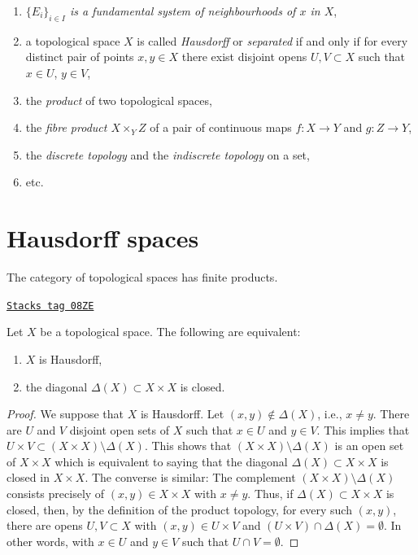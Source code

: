 \begin{enumerate}
$\mathcal{U} : U = \bigcup_{i \in I} U_i$
this means each $V_j$ is completely contained in one of the $U_i$),
\item
\label{topology-item-fundamental-system}
{\it $\{ E_i \}_{i \in I}$ is a fundamental system of neighbourhoods
of $x$ in $X$},
\item
\label{topology-item-Hausdorff}
a topological space $X$ is called {\it Hausdorff} or {\it separated}
if and only if for every distinct pair of points $x, y \in X$ there exist
disjoint opens $U, V \subset X$ such that $x \in U$, $y \in V$,
\item the {\it product} of two topological spaces,
\label{topology-item-product}
\item
\label{topology-item-fibre-product}
the {\it fibre product $X \times_Y Z$} of a pair of continuous maps
$f : X \to Y$ and $g : Z \to Y$,
\item
\label{topology-item-discrete-indiscrete}
the {\it discrete topology} and the {\it indiscrete topology} on a set,
\item etc.
\end{enumerate}

\section{Hausdorff spaces}
\label{topology-section-Hausdorff}
The category of topological spaces has finite products.

\begin{lemma}[Hausdorff]
\label{topology-lemma-Hausdorff}
\href{https://stacks.math.columbia.edu/tag/08ZE}{\texttt{Stacks tag 08ZE}}

Let $X$ be a topological space. The following are equivalent:
\begin{enumerate}
\item $X$ is Hausdorff,
\item the diagonal $\Delta(X) \subset X \times X$ is closed.
\end{enumerate}
\end{lemma}

\begin{proof}
We suppose that $X$ is Hausdorff. Let $(x, y) \not \in \Delta(X)$, i.e.,
$x \neq y$. There are $U$ and $V$ disjoint open sets of $X$
such that $x \in U$ and $y \in V$. This implies that $U \times V \subset
(X \times X) \setminus \Delta(X) $. This shows that $ (X \times X) \setminus
\Delta(X)$ is an open set of $ X \times X$ which is equivalent to saying that
the diagonal $\Delta(X) \subset X \times X$ is closed in $X \times X$.
The converse is similar:
The complement $(X \times X) \setminus \Delta(X)$ consists
precisely of $(x, y) \in X\times X$ with $ x \neq y$. Thus, if $ \Delta(X)
\subset X \times X$ is closed, then, by the definition of the product topology,
for every such $ (x, y)$, there are opens $U, V \subset X$ with $(x, y) \in
U \times V$ and $(U \times V)\cap \Delta(X) = \emptyset$. In other words, with
$x \in U$ and $y \in V$ such that $U \cap V = \emptyset$.
\end{proof}

